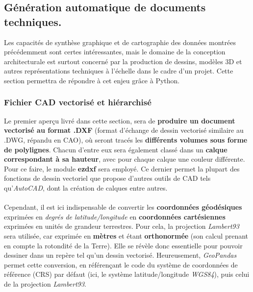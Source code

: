 \documentclass[
  11pt,
  french,
]{article}
\begin{document}
\newpage

\hypertarget{guxe9nuxe9ration-automatique-de-documents-techniques.}{%
\subsection{Génération automatique de documents
techniques.}\label{guxe9nuxe9ration-automatique-de-documents-techniques.}}

Les capacités de synthèse graphique et de cartographie des données
montrées précédemment sont certes intéressantes, mais le domaine de la
conception architecturale est surtout concerné par la production de
dessins, modèles 3D et autres représentations techniques à l'échelle
dans le cadre d'un projet. Cette section permettra de répondre à cet
enjeu grâce à Python.

\newpage

\hypertarget{fichier-cad-vectorisuxe9-et-hiuxe9rarchisuxe9}{%
\subsubsection{Fichier CAD vectorisé et
hiérarchisé}\label{fichier-cad-vectorisuxe9-et-hiuxe9rarchisuxe9}}

Le premier aperçu livré dans cette section, sera de \textbf{produire un
document vectorisé au format .DXF} (format d'échange de dessin vectorisé
similaire au .DWG, répandu en CAO), où seront tracés les
\textbf{différents volumes sous forme de polylignes}. Chacun d'entre eux
sera également classé dans un \textbf{calque correspondant à sa
hauteur}, avec pour chaque calque une couleur différente. Pour ce faire,
le module \textbf{ezdxf} sera employé. Ce dernier permet la plupart des
fonctions de dessin vectoriel que propose d'autres outils de CAD tels
qu'\emph{AutoCAD}, dont la création de calques entre autres.\\
~\\
Cependant, il est ici indispensable de convertir les \textbf{coordonnées
géodésiques} exprimées en \emph{degrés de latitude/longitude} en
\textbf{coordonnées cartésiennes} exprimées en unités de grandeur
terrestres. Pour cela, la projection \emph{Lambert93} sera utilisée, car
exprimée en \textbf{mètres} et étant \textbf{orthonormée} (son calcul
prenant en compte la rotondité de la Terre). Elle se révèle donc
essentielle pour pouvoir dessiner dans un repère tel qu'un dessin
vectorisé. Heureusement, \emph{GeoPandas} permet cette conversion, en
référençant le code du système de coordonnées de référence (CRS) par
défaut (ici, le système latitude/longitude \emph{WGS84}), puis celui de
la projection \emph{Lambert93}.
\end{document}
